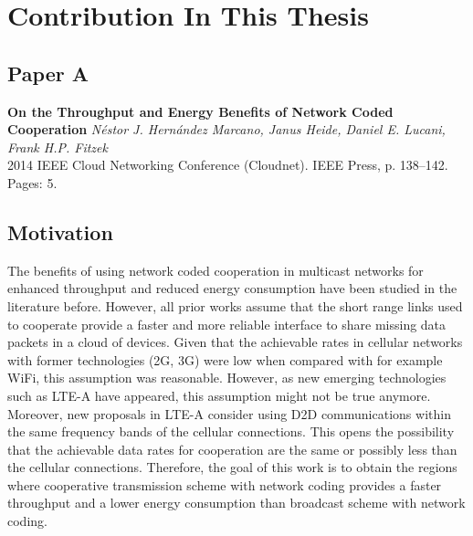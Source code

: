 \section{Contribution In This Thesis}\label{sec:contributions}

\subsection{Paper A}
\textbf{On the Throughput and Energy Benefits of Network Coded Cooperation}
\textit{N\'estor J. Hern\'andez Marcano, Janus Heide, Daniel E. Lucani, Frank H.P. Fitzek}
\\  2014 IEEE Cloud Networking Conference (Cloudnet). IEEE Press, p. 138--142.
\\ Pages: 5.

\subsection*{Motivation}
The benefits of using network coded cooperation in multicast networks for enhanced throughput and reduced energy consumption have been studied in the literature before. However, all prior works assume that the short range links used to cooperate provide a faster and more reliable interface to share missing data packets in a cloud of devices. Given that the achievable rates in cellular networks with former technologies (2G, 3G) were low when compared with for example WiFi, this assumption was reasonable. However, as new emerging technologies such as \ac{LTE-A} have appeared, this assumption might not be true anymore. Moreover, new proposals in \ac{LTE-A} consider using \ac{D2D} communications within the same frequency bands of the cellular connections. This opens the possibility that the achievable data rates for cooperation are the same or possibly less than the cellular connections. Therefore, the goal of this work is to obtain the regions where cooperative transmission scheme with network coding provides a faster throughput and a lower energy consumption than broadcast scheme with network coding.

